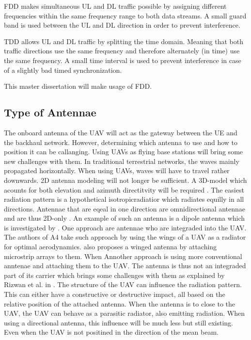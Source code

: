 \gls{FDD} makes simultaneous \gls{UL} and \gls{DL} traffic possible by assigning different frequencies within the same frequency range 
to both data streams. A small guard band is used between the \gls{UL} and \gls{DL} direction in order to prevent interference.

\gls{TDD} allows  \gls{UL} and \gls{DL} traffic by splitting the time domain. Meaning that both traffic directions use the same frequency and therefore
alternately (in time) use the same frequency. A small time interval is used to prevent interference in case of a slightly bad timed synchronization.

This master dissertation will make usage of \gls{FDD}.

\subsection{Type of Antennae} %

The onboard antenna of the \gls{UAV} will act as the gateway between the \gls{UE} and the backhaul network.
However, determining which antenna to use and how to position it can be callanging. Using \gls{UAV}s as flying base stations 
will bring some new challenges with them. In traditional terrestrial networks,
the waves mainly propagated horizontally. When using \gls{UAV}s, waves will have to travel rather downwards. 
2D antenna modeling will not longer be sufficient. A 3D-model which acounts for both elevation and azimuth directitvity will be required \cite{U12}.
The easiest radiation pattern is a hypothetical  \gls{isotropicradiatior} which radiates equilly in all directions.
Antennae that are eqeal in one direction are omnidirectional antennae and are thus 2D-only \cite{U12}. An example of such an antenna
is a dipole antenna which is investigated by \cite{A4}.
One approach are antennae who are integraded into the \gls{UAV}. The authors of \gls{A4} take such approach by using the 
wings of a \gls{UAV} as a radiator for optimal aerodynamics. \cite{A5} also proposes
a winged antenna by attaching microstrip arrays to them. When
Annother approach is using more conventional anntenae and attaching them to the \gls{UAV}. The antenna is thus not an integraded part 
of its carrier which brings some challenges with them as explained by Rizwan et al. in \cite{A1}.
The structure of the \gls{UAV} can influence the radiation pattern.  
This can either have a constructive or destructive impact, all based on the relative position of the attached antenna.
When the antenna is to close to the \gls{UAV}, the \gls{UAV} can behave as a parasitic radiator, also emitting radiation.
When using a directional antenna, this influence will be much less but still existing. Even when the \gls{UAV} is not 
positined in the direction of the mean beam.

